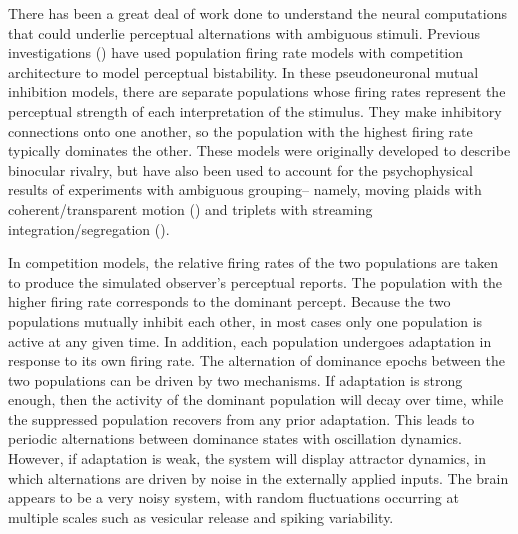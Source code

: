 There has been a great deal of work done to understand the neural computations that could underlie perceptual alternations with ambiguous stimuli. Previous investigations (\cite{Wilson1972, Wilson2003, Laing2002, Shpiro2009, Pastukhov2013}) have used population firing rate models with competition architecture to model perceptual bistability. In these pseudoneuronal mutual inhibition models, there are separate populations whose firing rates represent the perceptual strength of each interpretation of the stimulus. They make inhibitory connections onto one another, so the population with the highest firing rate typically dominates the other. These models were originally developed to describe binocular rivalry, but have also been used to account for the psychophysical results of experiments with ambiguous grouping-- namely, moving plaids with coherent/transparent motion (\cite{Shpiro2009, Laing2002, Pastukhov2013}) and triplets with streaming integration/segregation (\cite{Mill2013}).

In competition models, the relative firing rates of the two populations are taken to produce the simulated observer's perceptual reports. The population with the higher firing rate corresponds to the dominant percept. Because the two populations mutually inhibit each other, in most cases only one population is active at any given time. In addition, each population undergoes adaptation in response to its own firing rate. The alternation of dominance epochs between the two populations can be driven by two mechanisms. If adaptation is strong enough, then the activity of the dominant population will decay over time, while the suppressed population recovers from any prior adaptation. This leads to periodic alternations between dominance states with oscillation dynamics. However, if adaptation is weak, the system will display attractor dynamics, in which alternations are driven by noise in the externally applied inputs. The brain appears to be a very noisy system, with random fluctuations occurring at multiple scales such as vesicular release and spiking variability.

